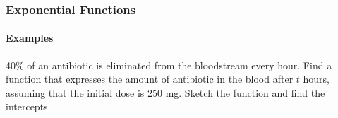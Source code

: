 \documentclass[9pt,xcolor=x11names,compress]{beamer}
\begin{document}
\begin{frame}[t]
\frametitle{Exponential Functions}
\framesubtitle{Examples}
\begin{example}
40\% of an antibiotic is eliminated from the bloodstream every hour.  Find a function that expresses the amount of antibiotic in the blood after $t$ hours, assuming that the initial dose is 250 mg.  \alert<3>{Sketch the function and find the intercepts.}
\end{example}
\end{frame}
\end{document}
